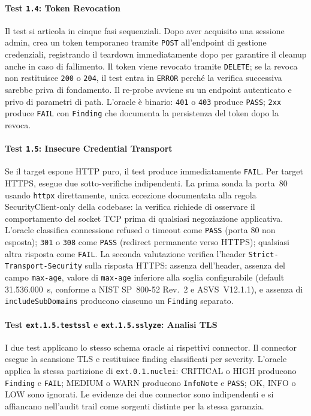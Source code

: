 \paragraph{Test \texttt{1.4}: Token Revocation}
Il test si articola in cinque fasi sequenziali. Dopo aver acquisito una sessione admin, crea un token temporaneo tramite \texttt{POST} all'endpoint di gestione credenziali, registrando il teardown immediatamente dopo per garantire il cleanup anche in caso di fallimento. Il token viene revocato tramite \texttt{DELETE}; se la revoca non restituisce \texttt{200} o \texttt{204}, il test entra in \texttt{ERROR} perché la verifica successiva sarebbe priva di fondamento. Il re-probe avviene su un endpoint autenticato e privo di parametri di path. L'oracle è binario: \texttt{401} o \texttt{403} produce \texttt{PASS}; \texttt{2xx} produce \texttt{FAIL} con \texttt{Finding} che documenta la persistenza del token dopo la revoca.



\paragraph{Test \texttt{1.5}: Insecure Credential Transport}
Se il target espone \gls{HTTP} puro, il test produce immediatamente \texttt{FAIL}. Per target \gls{HTTPS}, esegue due sotto-verifiche indipendenti. La prima sonda la porta~80 usando \texttt{httpx} direttamente, unica eccezione documentata alla regola SecurityClient-only della codebase: la verifica richiede di osservare il comportamento del socket TCP prima di qualsiasi negoziazione applicativa. L'oracle classifica connessione refused o timeout come \texttt{PASS} (porta 80 non esposta); \texttt{301} o \texttt{308} come \texttt{PASS} (redirect permanente verso \gls{HTTPS}); qualsiasi altra risposta come \texttt{FAIL}. La seconda valutazione verifica l'header \texttt{Strict-Transport-Security} sulla risposta \gls{HTTPS}: assenza dell'header, assenza del campo \texttt{max-age}, valore di \texttt{max-age} inferiore alla soglia configurabile (default 31.536.000~s, conforme a \gls{NIST} SP~800-52 Rev.~2 e \gls{ASVS}~V12.1.1), e assenza di \texttt{includeSubDomains} producono ciascuno un \texttt{Finding} separato.

\paragraph{Test \texttt{ext.1.5.testssl} e \texttt{ext.1.5.sslyze}: Analisi TLS}
I due test applicano lo stesso schema oracle ai rispettivi connector. Il connector esegue la scansione \gls{TLS} e restituisce finding classificati per severity. L'oracle applica la stessa partizione di \texttt{ext.0.1.nuclei}: CRITICAL o HIGH producono \texttt{Finding} e \texttt{FAIL}; MEDIUM o WARN producono \texttt{InfoNote} e \texttt{PASS}; OK, INFO o LOW sono ignorati. Le evidenze dei due connector sono indipendenti e si affiancano nell'audit trail come sorgenti distinte per la stessa garanzia.


